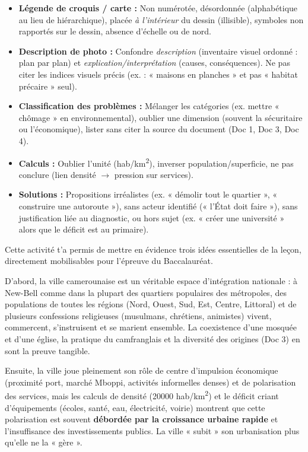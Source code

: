 \documentclass[11pt]{article}
\newcommand{\cle}[1]{{\popxbold\color{popdark}#1}}
\newcounter{popsec}
\newcounter{popsub}
\newcommand{\courssub}[1]{%
  \stepcounter{popsub}%
  \par\vspace{9pt}\noindent{\popxbold\fontsize{11.5}{13}\selectfont\color{popink}{\color{poporange}\thepopsec.\thepopsub}\hspace{6pt}#1}\par\nopagebreak\vspace{4pt}
}
\begin{document}
\begin{attention}
\begin{itemize}
\item \textbf{Légende de croquis / carte :} Non numérotée, désordonnée (alphabétique au lieu de hiérarchique), placée \emph{à l'intérieur} du dessin (illisible), symboles non rapportés sur le dessin, absence d'échelle ou de nord.
\item \textbf{Description de photo :} Confondre \emph{description} (inventaire visuel ordonné : plan par plan) et \emph{explication/interprétation} (causes, conséquences). Ne pas citer les indices visuels précis (ex. : « maisons en planches » et pas « habitat précaire » seul).
\item \textbf{Classification des problèmes :} Mélanger les catégories (ex. mettre « chômage » en environnemental), oublier une dimension (souvent la sécuritaire ou l'économique), lister sans citer la source du document (Doc 1, Doc 3, Doc 4).
\item \textbf{Calculs :} Oublier l'unité (hab/km\textsuperscript{2}), inverser population/superficie, ne pas conclure (lien densité $\rightarrow$ pression sur services).
\item \textbf{Solutions :} Propositions irréalistes (ex. « démolir tout le quartier », « construire une autoroute »), sans acteur identifié (« l'État doit faire »), sans justification liée au diagnostic, ou hors sujet (ex. « créer une université » alors que le déficit est au primaire).
\end{itemize}
\end{attention}

\courssub{Bilan de l'activité}

Cette activité t'a permis de mettre en évidence trois idées essentielles de la leçon, directement mobilisables pour l'épreuve du Baccalauréat.

D'abord, la ville camerounaise est un véritable \cle{espace d'intégration nationale} : à New-Bell comme dans la plupart des quartiers populaires des métropoles, des populations de toutes les régions (Nord, Ouest, Sud, Est, Centre, Littoral) et de plusieurs confessions religieuses (musulmans, chrétiens, animistes) vivent, commercent, s'instruisent et se marient ensemble. La coexistence d'une mosquée et d'une église, la pratique du \cle{camfranglais} et la diversité des origines (Doc 3) en sont la preuve tangible.

Ensuite, la ville joue pleinement son rôle de \cle{centre d'impulsion économique} (proximité port, marché Mboppi, activités informelles denses) et de \cle{polarisation des services}, mais les calculs de densité (\num{20000} hab/km\textsuperscript{2}) et le déficit criant d'équipements (écoles, santé, eau, électricité, voirie) montrent que cette polarisation est souvent \textbf{débordée par la croissance urbaine rapide} et l'insuffisance des investissements publics. La ville « subit » son urbanisation plus qu'elle ne la « gère ».
\end{document}
